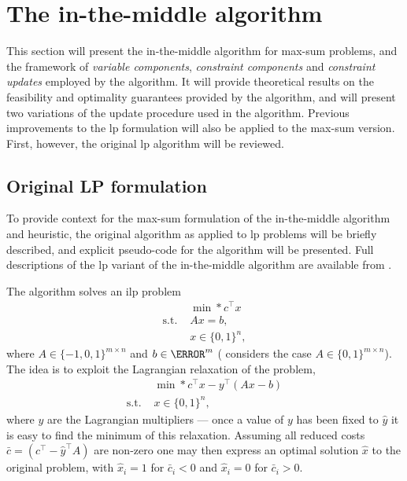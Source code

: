 \section{The in-the-middle algorithm}
This section will present the in-the-middle algorithm for max-sum problems, and the framework of \emph{variable components}, \emph{constraint components} and \emph{constraint updates} employed by the algorithm.
It will provide theoretical results on the feasibility and optimality guarantees provided by the algorithm, and will present two variations of the update procedure used in the algorithm.
Previous improvements to the \gls{lp} formulation will also be applied to the max-sum version.
First, however, the original \gls{lp} algorithm will be reviewed.

\subsection{Original LP formulation}
To provide context for the max-sum formulation of the in-the-middle algorithm and heuristic, the original algorithm as applied to \gls{lp} problems will be briefly described, and explicit pseudo-code for the algorithm will be presented.
Full descriptions of the \gls{lp} variant of the in-the-middle algorithm are available from \textcites{Wedelin95}{Bastert10}.

The algorithm solves an \gls{ilp} problem
\begin{equation}\label{eq:ilp}
	\begin{aligned}
		{}           & \min*{c^\top x} \\
		\text{s.t. } & Ax = b, \\
		{}           & x \in \{0,1\}^n,
	\end{aligned}
\end{equation}
where \(A \in \{-1,0,1\}^{m\times n}\) and \(b\in\N^m\) (\textcite{Wedelin95} considers the case \(A \in \{0,1\}^{m\times n}\)).
The idea is to exploit the Lagrangian relaxation of the problem,
\begin{equation}\label{eq:ilp-lagrange}
	\begin{aligned}
		{}           & \min*{c^\top x - y^\top (Ax - b)}\\
		\text{s.t. } & x \in \{0,1\}^n,
	\end{aligned}
\end{equation}
where \(y\) are the Lagrangian multipliers --- once a value of \(y\) has been fixed to \(\hat{y}\) it is easy to find the minimum of this relaxation.
Assuming all reduced costs \(\bar{c} = (c^\top - \hat{y}^\top A)\) are non-zero one may then express an optimal solution \(\hat{x}\) to the original problem, with \(\hat{x}_i = 1\) for \(\bar{c}_i < 0\) and \(\hat{x}_i = 0\) for \(\bar{c}_i > 0\).

